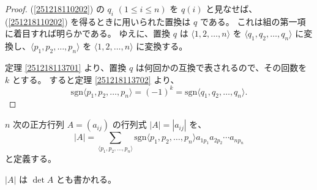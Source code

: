 \begin{proof}
  (\ref{251218110202}) の \(q_i\) \((1\leq i\leq n)\) を \(q(i)\) と見なせば、(\ref{251218110202}) を得るときに用いられた置換は \(q\) である。
  これは組の第一項に着目すれば明らかである。
  ゆえに、置換 \(q\) は \(\langle 1,2,\ldots,n\rangle\) を \(\langle q_1,q_2,\ldots,q_n\rangle\) に変換し、\(\langle p_1,p_2,\ldots,p_n\rangle\) を \(\langle 1,2,\ldots,n\rangle\) に変換する。

  定理 \ref{251218113701} より、置換 \(q\) は何回かの互換で表されるので、その回数を \(k\) とする。
  すると定理 \ref{251218113702} より、
  \[\mathrm{sgn}\langle p_1,p_2,\ldots,p_n\rangle=(-1)^k=\mathrm{sgn}\langle q_1,q_2,\ldots,q_n\rangle.\]
\end{proof}

\begin{dfn}[行列式]\label{251218223401}
  \(n\) 次の正方行列 \(A=(a_{ij})\) の行列式 \(|A|=|a_{ij}|\) を、
  \[|A|=\sum_{\langle p_1,p_2,\ldots,p_n\rangle}\mathrm{sgn}\langle p_1,p_2,\ldots,p_n\rangle a_{1 p_1}a_{2 p_2}\cdots a_{n p_n}\]
  と定義する。

  \(|A|\) は \(\det A\) とも書かれる。
\end{dfn}


